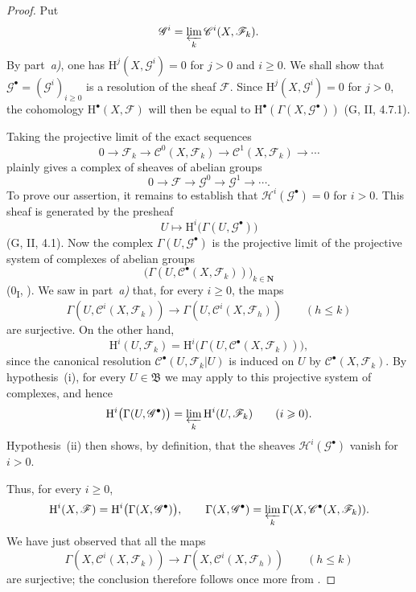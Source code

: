 \documentclass[oneside]{amsart}
\makeatletter
\theoremstyle{ega-env-style}
\theoremstyle{ega-thm-env-style}
\theoremstyle{ega-defn-env-style}
\def\mathcal{\mathscr}
\def\sh{\mathcal}                   %
\def\bb{\mathbf}                    %
\def\leq{\leqslant}                 %
\def\geq{\geqslant}                 %
\def\HH{\mathrm{H}}                 %
\let\EGAReaderOriginalHyperref\hyperref
\renewcommand{\hyperref}[2][]{%
  \@ifundefined{r@#1}{#2}{\EGAReaderOriginalHyperref[#1]{#2}}}
\makeatother
\begin{document}
\begin{proof}
Put
\[
  \sh{G}^i=\varprojlim_k\sh{C}^i(X,\sh{F}_k).
\]
By part~\emph{a)}, one has
$\HH^j(X,\sh{G}^i)=0$ for $j>0$ and $i\geq0$.
We shall show that
$\sh{G}^\bullet=(\sh{G}^i)_{i\geq0}$ is a resolution of the sheaf
$\sh{F}$. Since $\HH^j(X,\sh{G}^i)=0$ for $j>0$, the cohomology
$\HH^\bullet(X,\sh{F})$ will then be equal to
$\HH^\bullet(\Gamma(X,\sh{G}^\bullet))$ (G, II, 4.7.1).

Taking the projective limit of the exact sequences
\[
  0\longrightarrow\sh{F}_k
  \longrightarrow\sh{C}^0(X,\sh{F}_k)
  \longrightarrow\sh{C}^1(X,\sh{F}_k)
  \longrightarrow\cdots
\]
plainly gives a complex of sheaves of abelian groups
\[
  0\longrightarrow\sh{F}
  \longrightarrow\sh{G}^0
  \longrightarrow\sh{G}^1
  \longrightarrow\cdots.
\]
To prove our assertion, it remains to establish that
$\sh{H}^i(\sh{G}^\bullet)=0$ for $i>0$.
This sheaf is generated by the presheaf
\[
  U\longmapsto\HH^i\bigl(\Gamma(U,\sh{G}^\bullet)\bigr)
\]
(G, II, 4.1).
Now the complex $\Gamma(U,\sh{G}^\bullet)$ is the projective limit of
the projective system of complexes of abelian groups
\[
  \bigl(\Gamma(U,\sh{C}^\bullet(X,\sh{F}_k))\bigr)_{k\in\bb{N}}
\]
(0\textsubscript{I}, \hyperref[0.3.2.6]{3.2.6}).
We saw in part~\emph{a)} that, for every $i\geq0$, the maps
\[
  \Gamma(U,\sh{C}^i(X,\sh{F}_k))
  \longrightarrow
  \Gamma(U,\sh{C}^i(X,\sh{F}_h))
  \qquad(h\leq k)
\]
are surjective. On the other hand,
\[
  \HH^i(U,\sh{F}_k)
  =
  \HH^i\bigl(\Gamma(U,\sh{C}^\bullet(X,\sh{F}_k))\bigr),
\]
since the canonical resolution $\sh{C}^\bullet(U,\sh{F}_k|U)$ is
induced on $U$ by $\sh{C}^\bullet(X,\sh{F}_k)$.
By hypothesis~{\rm(i)}, for every $U\in\mathfrak{B}$ we may apply
 to this projective system of complexes, and hence
\[
  \HH^i\bigl(\Gamma(U,\sh{G}^\bullet)\bigr)
  =
  \varprojlim_k\HH^i(U,\sh{F}_k)
  \qquad(i\geq0).
\]
Hypothesis~{\rm(ii)} then shows, by definition, that the sheaves
$\sh{H}^i(\sh{G}^\bullet)$ vanish for $i>0$.

Thus, for every $i\geq0$,
\[
  \HH^i(X,\sh{F})
  =
  \HH^i\bigl(\Gamma(X,\sh{G}^\bullet)\bigr),
  \qquad
  \Gamma(X,\sh{G}^\bullet)
  =
  \varprojlim_k\Gamma(X,\sh{C}^\bullet(X,\sh{F}_k)).
\]
We have just observed that all the maps
\[
  \Gamma(X,\sh{C}^i(X,\sh{F}_k))
  \longrightarrow
  \Gamma(X,\sh{C}^i(X,\sh{F}_h))
  \qquad(h\leq k)
\]
are surjective; the conclusion therefore follows once more from
.
\end{proof}
\end{document}
